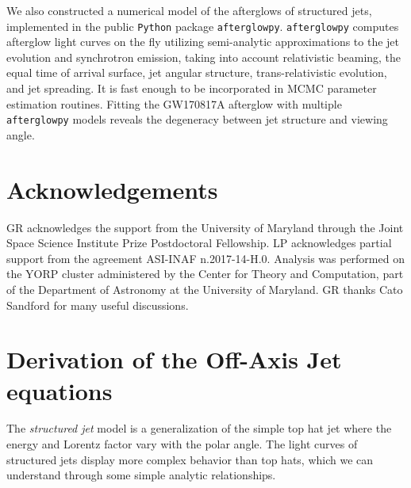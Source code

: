 \documentclass[twocolumn]{aastex62}
\newcommand{\gwbns}{GW170817A}
\newcommand{\afterglowpy}{{\tt afterglowpy}}
\newcommand{\python}{{\tt Python}}
\begin{document}
We also constructed a numerical model of the afterglows of structured jets, implemented in the public \python{} package \afterglowpy{}. \afterglowpy{} computes afterglow light curves on the fly utilizing semi-analytic approximations to the jet evolution and synchrotron emission, taking into account relativistic beaming, the equal time of arrival surface, jet angular structure, trans-relativistic evolution, and jet spreading.  It is fast enough to be incorporated in MCMC parameter estimation routines.  Fitting the \gwbns{} afterglow with multiple \afterglowpy{} models reveals the degeneracy between jet structure and viewing angle.

\section{Acknowledgements} \label{sec:acknowledgements}

GR acknowledges the support from the University of Maryland through the Joint Space Science Institute Prize Postdoctoral Fellowship. LP acknowledges partial support from the agreement ASI-INAF n.2017-14-H.0. Analysis was performed on the YORP cluster administered by the Center for Theory and Computation, part of the Department of Astronomy at the University of Maryland.  GR thanks Cato Sandford for many useful discussions.

\newpage


\appendix
\section{Derivation of the Off-Axis Jet equations}\label{app:derive1}

  The \emph{structured jet} model is a generalization of the simple top hat jet where the energy and Lorentz factor vary with the polar angle.  The light curves of structured jets display more complex behavior than top hats, which we can understand through some simple analytic relationships.
  
\end{document}

